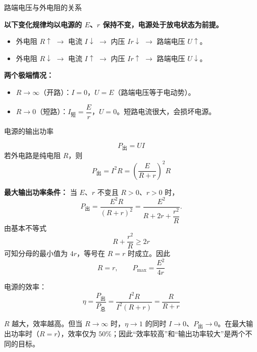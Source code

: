 \begin{conceptbox}{路端电压与外电阻的关系}

\textbf{以下变化规律均以电源的 $E$、$r$ 保持不变，电源处于放电状态为前提。}
\begin{itemize}
  \item 外电阻 $R \uparrow$ $\to$ 电流 $I \downarrow$ $\to$ 内压 $Ir \downarrow$ $\to$ 路端电压 $U \uparrow$。
  \item 外电阻 $R \downarrow$ $\to$ 电流 $I \uparrow$ $\to$ 内压 $Ir \uparrow$ $\to$ 路端电压 $U \downarrow$。
\end{itemize}

\textbf{两个极端情况：}
\begin{itemize}
  \item $R \to \infty$（开路）：$I = 0$，$U = E$（路端电压等于电动势）。
  \item $R \to 0$（短路）：$I_{\text{短}} = \dfrac{E}{r}$，$U = 0$。短路电流很大，会损坏电源。
\end{itemize}

\end{conceptbox}

\begin{conceptbox}{电源的输出功率}

\[
P_{\text{出}} = UI
\]
若外电路是纯电阻 $R$，则
\[
P_{\text{出}} = I^2R = \left(\frac{E}{R+r}\right)^2 R
\]

\textbf{最大输出功率条件：} 当 $E$、$r$ 不变且 $R>0$、$r>0$ 时，
\[
P_{\text{出}}
=\frac{E^2R}{(R+r)^2}
=\frac{E^2}{R+2r+\dfrac{r^2}{R}}.
\]
由基本不等式
\[
R+\frac{r^2}{R}\geq 2r
\]
可知分母的最小值为 $4r$，等号在 $R=r$ 时成立。因此
\[
\boxed{R=r},\qquad
P_{\max} = \frac{E^2}{4r}
\]

\begin{center}


\label{fig:power-output}
\end{center}

电源的效率：
\[
\eta = \frac{P_{\text{出}}}{P_{\text{总}}} = \frac{I^2R}{I^2(R+r)} = \frac{R}{R+r}
\]

$R$ 越大，效率越高。但当 $R\to\infty$ 时，$\eta\to 1$ 的同时 $I\to 0$、$P_{\text{出}}\to 0$。在最大输出功率时（$R = r$），效率仅为 $50\%$；因此“效率较高”和“输出功率较大”是两个不同的目标。

\end{conceptbox}


